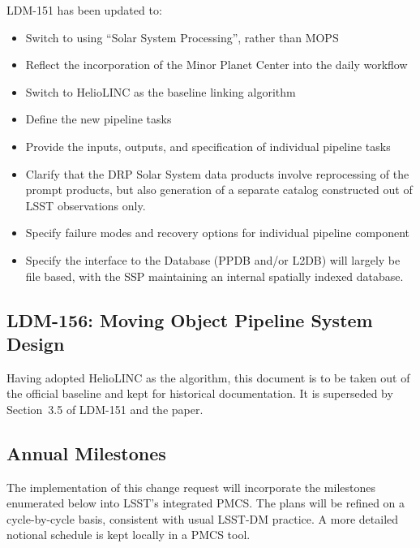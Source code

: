 \documentclass[DM,authoryear,toc]{lsstdoc}
\begin{document}
LDM-151 has been updated to:
%
\begin{itemize}
	\item Switch to using ``Solar System Processing'', rather than MOPS
	\item Reflect the incorporation of the Minor Planet Center into the daily workflow
	\item Switch to HelioLINC as the baseline linking algorithm
	\item Define the new pipeline tasks
	\item Provide the inputs, outputs, and specification of individual pipeline tasks
	\item Clarify that the DRP Solar System data products involve reprocessing of the prompt products, but also generation of a separate catalog constructed out of LSST observations only.
	\item Specify failure modes and recovery options for individual pipeline component
	\item Specify the interface to the Database (PPDB and/or L2DB) will largely be file based, with the SSP maintaining an internal spatially indexed database.
\end{itemize}

\subsection{LDM-156: Moving Object Pipeline System Design}

Having adopted HelioLINC as the algorithm, this document is to be taken out of the official baseline and kept for historical documentation. It is superseded by Section~3.5 of LDM-151 and the \cite{2018AJ....156..135H} paper.

\subsection{Annual Milestones}

The implementation of this change request will incorporate the milestones enumerated below into LSST's integrated PMCS. The plans will be refined on a cycle-by-cycle basis, consistent with usual LSST-DM practice. A more detailed notional schedule is kept locally in a PMCS tool.
\end{document}
